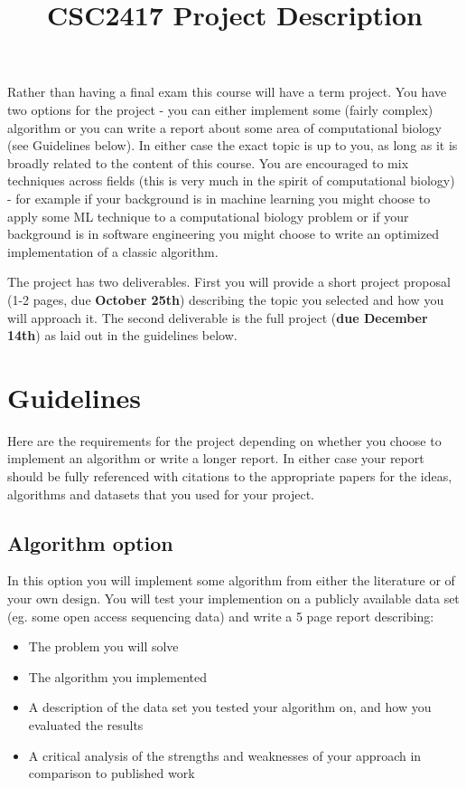 \documentclass[12pt]{article}
\title{CSC2417 Project Description}
\begin{document}
\maketitle

Rather than having a final exam this course will have a term project. You have two options for the project - you can either implement some (fairly complex) algorithm or you can write a report about some area of computational biology (see Guidelines below). In either case the exact topic is up to you, as long as it is broadly related to the content of this course. You are encouraged to mix techniques across fields (this is very much in the spirit of computational biology) - for example if your background is in machine learning you might choose to apply some ML technique to a computational biology problem or if your background is in software engineering you might choose to write an optimized implementation of a classic algorithm.

The project has two deliverables. First you will provide a short project proposal (1-2 pages, due \textbf{October 25th}) describing the topic you selected and how you will approach it. The second deliverable is the full project (\textbf{due December 14th}) as laid out in the guidelines below.

\section*{Guidelines}

Here are the requirements for the project depending on whether you choose to implement an algorithm or write a longer report. In either case your report should be fully referenced with citations to the appropriate papers for the ideas, algorithms and datasets that you used for your project.

\subsection*{Algorithm option}

In this option you will implement some algorithm from either the literature or of your own design. You will test your implemention on a publicly available data set (eg. some open access sequencing data) and write a 5 page report describing:

\begin{itemize}
\item The problem you will solve
\item The algorithm you implemented
\item A description of the data set you tested your algorithm on, and how you evaluated the results
\item A critical analysis of the strengths and weaknesses of your approach in comparison to published work
\end{itemize}
\end{document}
